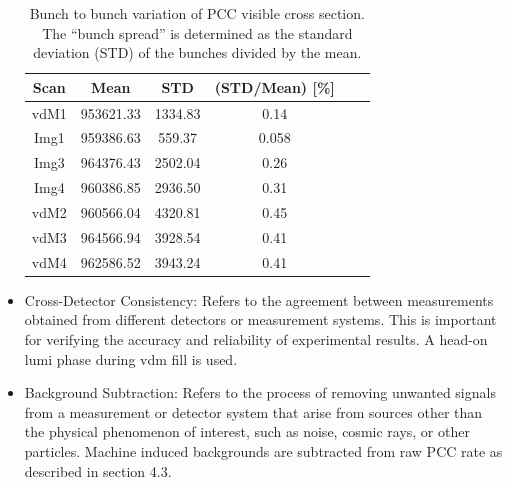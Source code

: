 \begin{itemize}
\begin{table}[h]
  \centering
  \caption[$\sigma_{vis}$ bunch variation uncertainty]{Bunch to bunch variation of PCC visible cross section. The “bunch spread” is determined as the standard deviation (STD) of the bunches divided by the mean.}
\begin{tabular}{cccccc}
\textbf{Scan} & \textbf{Mean} & \textbf{STD} & \textbf{(STD/Mean) [\%]} \\
\hline
vdM1 & 953621.33 & 1334.83 & 0.14 \\
Img1 & 959386.63 & 559.37 & 0.058 \\
Img3 & 964376.43 & 2502.04 & 0.26 \\
Img4 & 960386.85 & 2936.50 & 0.31 \\
vdM2 & 960566.04 & 4320.81 & 0.45 \\
vdM3 & 964566.94 & 3928.54 & 0.41 \\
vdM4 & 962586.52 & 3943.24 & 0.41 \\
\end{tabular}
\label{tab:sigmavis_btob_values}
\end{table}

\item Cross-Detector Consistency: Refers to the agreement between measurements obtained from different detectors or measurement systems. This is important for verifying the accuracy and reliability of experimental results. A head-on lumi phase during vdm fill is used.

\item Background Subtraction: Refers to the process of removing unwanted signals from a measurement or detector system that arise from sources other than the physical phenomenon of interest, such as noise, cosmic rays, or other particles. Machine induced backgrounds are subtracted from raw PCC rate as described in section 4.3. %

\end{itemize}

